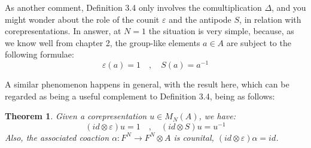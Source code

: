 \documentclass[12pt]{amsbook}
\newtheorem{theorem}{Theorem}[chapter]
\begin{document}
\bigskip

As another comment, Definition 3.4 only involves the comultiplication $\Delta$, and you might wonder about the role of the counit $\varepsilon$ and the antipode $S$, in relation with corepresentations. In answer, at $N=1$ the situation is very simple, because, as we know well from chapter 2, the group-like elements $a\in A$ are subject to the following formulae:
$$\varepsilon(a)=1\quad,\quad S(a)=a^{-1}$$

A similar phenomenon happens in general, with the result here, which can be regarded as being a useful complement to Definition 3.4, being as follows:

\begin{theorem}
Given a corepresentation $u\in M_N(A)$, we have:
$$(id\otimes\varepsilon)u=1\quad,\quad (id\otimes S)u=u^{-1}$$
Also, the associated coaction $\alpha:F^N\to F^N\otimes A$ is counital, $(id\otimes\varepsilon)\alpha=id$.
\end{theorem}
\end{document}
